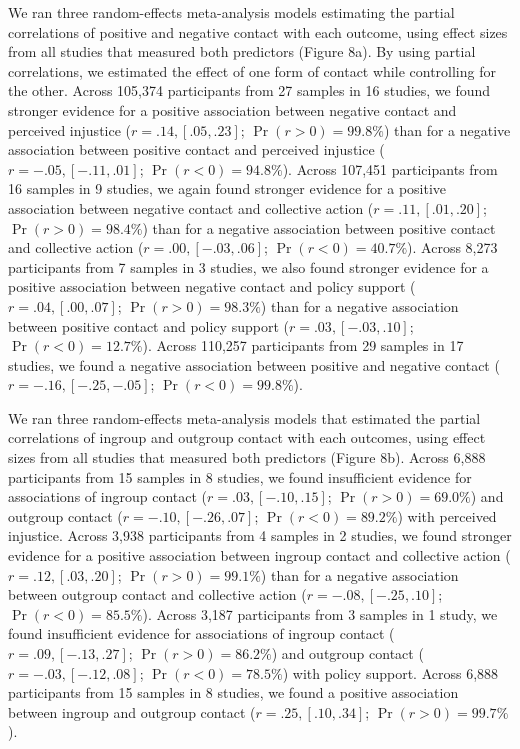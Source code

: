 \documentclass[12pt, letterpaper]{article}
\begin{document}
We ran three random-effects meta-analysis models estimating the partial
correlations of positive and negative contact with each outcome, using
effect sizes from all studies that measured both predictors (Figure 8a).
By using partial correlations, we estimated the effect of one form of
contact while controlling for the other. Across 105,374 participants
from 27 samples in 16 studies, we found stronger evidence for a positive
association between negative contact and perceived injustice
(\(r = .14, [.05, .23]\); \(\Pr (r > 0) = 99.8\%\)) than for a negative
association between positive contact and perceived injustice
(\(r = -.05, [-.11, .01]\); \(\Pr (r < 0) = 94.8\%\)). Across 107,451
participants from 16 samples in 9 studies, we again found stronger
evidence for a positive association between negative contact and
collective action (\(r = .11, [.01, .20]\); \(\Pr (r > 0) = 98.4\%\))
than for a negative association between positive contact and collective
action (\(r = .00, [-.03, .06]\); \(\Pr (r < 0) = 40.7\%\)). Across
8,273 participants from 7 samples in 3 studies, we also found stronger
evidence for a positive association between negative contact and policy
support (\(r = .04, [.00, .07]\); \(\Pr (r > 0) = 98.3\%\)) than for a
negative association between positive contact and policy support
(\(r = .03, [-.03, .10]\); \(\Pr (r < 0) = 12.7\%\)). Across 110,257
participants from 29 samples in 17 studies, we found a negative
association between positive and negative contact
(\(r = -.16, [-.25, -.05]\); \(\Pr (r < 0) = 99.8\%\)).

We ran three random-effects meta-analysis models that estimated the
partial correlations of ingroup and outgroup contact with each outcomes,
using effect sizes from all studies that measured both predictors
(Figure 8b). Across 6,888 participants from 15 samples in 8 studies, we
found insufficient evidence for associations of ingroup contact
(\(r = .03, [-.10, .15]\); \(\Pr (r > 0) = 69.0\%\)) and outgroup
contact (\(r = -.10, [-.26, .07]\); \(\Pr (r < 0) = 89.2\%\)) with
perceived injustice. Across 3,938 participants from 4 samples in 2
studies, we found stronger evidence for a positive association between
ingroup contact and collective action (\(r = .12, [.03, .20]\);
\(\Pr (r > 0) = 99.1\%\)) than for a negative association between
outgroup contact and collective action (\(r = -.08, [-.25, .10]\);
\(\Pr (r < 0) = 85.5\%\)). Across 3,187 participants from 3 samples in 1
study, we found insufficient evidence for associations of ingroup
contact (\(r = .09, [-.13, .27]\); \(\Pr (r > 0) = 86.2\%\)) and
outgroup contact (\(r = -.03, [-.12, .08]\); \(\Pr (r < 0) = 78.5\%\))
with policy support. Across 6,888 participants from 15 samples in 8
studies, we found a positive association between ingroup and outgroup
contact (\(r = .25, [.10, .34]\); \(\Pr (r > 0) = 99.7\%\)).
\end{document}
